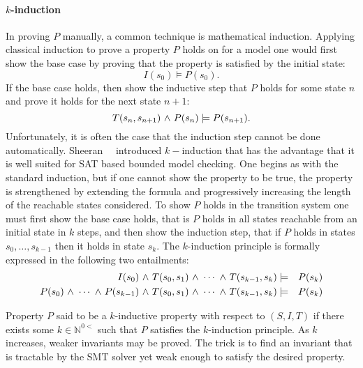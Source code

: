 \paragraph{$k$-induction}  In proving $P$ manually, a common technique
is mathematical induction.  Applying classical induction to prove a
property $P$ holds on  for a model one would first show the base case
by proving that the property is satisfied by the initial state:
$$I(s_0) \models P(s_0).$$
If the base case holds, then show the inductive step that $P$ holds
for some state $n$ and prove it holds for the next state $n+1:$
$$ T(s_{n},s_{n+1}) {\ \wedge \ } P(s_n) \models P(s_{n+1}).$$
Unfortunately, it is often the case that the induction step cannot be
done automatically.   Sheeran~\etal~\cite{Sheeran00, EenS03} introduced
$k-$induction that has the advantage that it is well suited for SAT
based bounded model checking.  One begins as with the standard
induction, but if one cannot show the property to be true, the
property is strengthened by extending the formula and
progressively increasing the length of the reachable states
considered.  To show $P$ holds in the transition system one must first
show the base case holds, that is $P$ holds in all states reachable
from an initial state in $k$ steps, and then show the induction step,
that if $P$ holds in states $s_0,\ldots,s_{k-1}$ then it holds in
state $s_k.$ The $k$-induction principle is formally expressed in the
following two entailments:
\begin{eqnarray*}
I(s_0) {\ \wedge \ } T(s_0,s_1) {\ \wedge \ } \cdots {\ \wedge \ } T(s_{k-1},s_k) &\models&
P(s_k) \\
P(s_0) {\ \wedge \ } \cdots {\ \wedge \ } P(s_{k-1}) {\ \wedge \ } T(s_0,s_1) {\ \wedge \ } \cdots {\ \wedge \ } T(s_{k-1},s_k) &\models&
P(s_k) 
\end{eqnarray*} 

Property $P$ said to be a $k$-inductive property with respect to
$(S,I,T)$ if there exists some $k \in \mathbb{N}^{0<}$ such that $P$
satisfies the $k$-induction principle. As $k$ increases, weaker
invariants may be proved.  The trick is to find an invariant that is
tractable by the SMT solver yet weak enough to satisfy the desired
property.  

